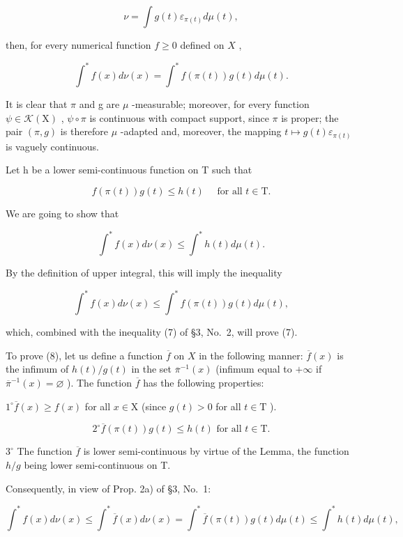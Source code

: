 \[
\nu = \int g (t) \varepsilon_ {\pi (t)} d \mu (t),
\]

then, for every numerical function \(f \geqslant 0\) defined on \(X\) ,

\[
\int^ {*} f (x) d \nu (x) = \int^ {*} f (\pi (t)) g (t) d \mu (t).\tag{7}
\]

It is clear that \(\pi\) and g are \(\mu\) -measurable; moreover, for every function \(\psi \in \mathcal{K}(\mathrm{X})\) , \(\psi \circ \pi\) is continuous with compact support, since \(\pi\) is proper; the pair \((\pi, g)\) is therefore \(\mu\) -adapted and, moreover, the mapping \(t \mapsto g(t) \varepsilon_{\pi(t)}\) is vaguely continuous.

Let h be a lower semi-continuous function on T such that

\[
f (\pi (t)) g (t) \leqslant h (t) \quad \text { for   all } t \in \mathrm{T}.
\]

We are going to show that

\[
\int^ {*} f (x) d \nu (x) \leqslant \int^ {*} h (t) d \mu (t).\tag{8}
\]

By the definition of upper integral, this will imply the inequality

\[
\int^ {*} f (x) d \nu (x) \leqslant \int^ {*} f (\pi (t)) g (t) d \mu (t),
\]

which, combined with the inequality (7) of §3, No.~2, will prove (7).

To prove (8), let us define a function \(\overline{f}\) on \(X\) in the following manner: \(\overline{f}(x)\) is the infimum of \(h(t) / g(t)\) in the set \(\overline{\pi}^{-1}(x)\) (infimum equal to \(+\infty\) if \(\overline{\pi}^{-1}(x) = \varnothing\) ). The function \(\overline{f}\) has the following properties:

\(1^{\circ}\overline{f} (x)\geqslant f(x)\) for all \(x\in \mathrm{X}\) (since \(g(t) > 0\) for all \(t\in \mathrm{T}\) ).

\[
2 ^ {\circ} \overline {{f}} (\pi (t)) g (t) \leqslant h (t) \text {   for   all   } t \in \mathrm{T}.
\]

\(3^{\circ}\) The function \(\overline{f}\) is lower semi-continuous by virtue of the Lemma, the function \(h / g\) being lower semi-continuous on T.

Consequently, in view of Prop. 2a) of §3, No.~1:

\[
\int^ {*} f (x) d \nu (x) \leqslant \int^ {*} \overline {{{f}}} (x) d \nu (x) = \int^ {*} \overline {{{f}}} (\pi (t)) g (t) d \mu (t) \leqslant \int^ {*} h (t) d \mu (t),
\]

